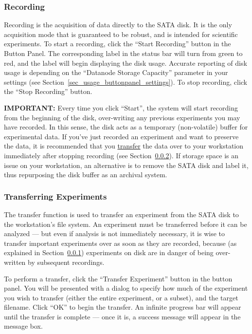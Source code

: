 \subsubsection{Recording}
\label{sec_usage_buttonpanel_recording}

Recording is the acquisition of data directly to the SATA disk. It is the only acquisition mode that is guaranteed to be robust, and is intended for scientific experiments. To start a recording, click the ``Start Recording'' button in the Button Panel. The corresponding label in the status bar will turn from green to red, and the label will begin displaying the disk usage. Accurate reporting of disk usage is depending on the ``Datanode Storage Capacity'' parameter in your settings (see Section~\ref{sec_usage_buttonpanel_settings}). To stop recording, click the ``Stop Recording'' button.

\vspace{5mm}
\noindent \textbf{IMPORTANT:} Every time you click ``Start'', the system will start recording from the beginning of the disk, over-writing any previous experiments you may have recorded. In this sense, the disk acts as a temporary (non-volatile) buffer for experimental data. If you've just recorded an experiment and want to preserve the data, it is recommended that you \underline{transfer} the data over to your workstation immediately after stopping recording (see Section~\ref{sec_usage_buttonpanel_transfer}). If storage space is an issue on your workstation, an alternative is to remove the SATA disk and label it, thus repurposing the disk buffer as an archival system.

\subsubsection{Transferring Experiments}
\label{sec_usage_buttonpanel_transfer}

The transfer function is used to transfer an experiment from the SATA disk to the workstation's file system. An experiment must be transferred before it can be analyzed --- but even if analysis is not immediately necessary, it is wise to transfer important experiments over as soon as they are recorded, because (as explained in Section~\ref{sec_usage_buttonpanel_recording}) experiments on disk are in danger of being over-written by subsequent recordings.

To perform a transfer, click the ``Transfer Experiment'' button in the button panel. You will be presented with a dialog to specify how much of the experiment you wish to transfer (either the entire experiment, or a subset), and the target filename. Click ``OK'' to begin the transfer. An infinite progress bar will appear until the transfer is complete --- once it is, a success message will appear in the message box.

